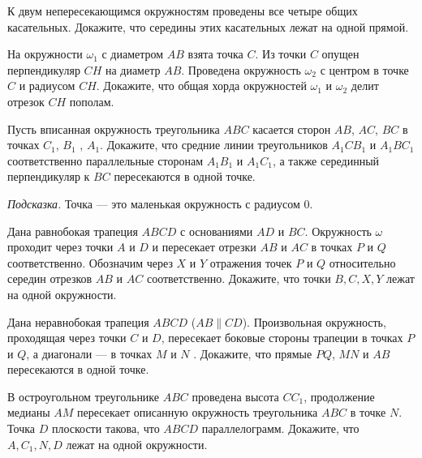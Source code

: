 \begin{problems}

\item К двум непересекающимся окружностям проведены все четыре общих касательных. Докажите, что середины этих касательных лежат на одной прямой.


\item На окружности $\omega_1$ с диаметром $AB$ взята точка $C$. Из точки $C$ опущен перпендикуляр $CH$ на диаметр $AB$. Проведена окружность $\omega_2$ с центром в точке $C$ и радиусом $CH$. Докажите, что общая хорда окружностей $\omega_1$ и $\omega_2$ делит отрезок $CH$ пополам.

\item Пусть вписанная окружность треугольника $ABC$ касается сторон $AB$, $AC$, $BC$ в точках $C_1$, $B_1$ , $A_1$. Докажите, что средние линии треугольников $A_1 CB_1$ и $A_1BC_1$ соответственно параллельные сторонам $A_1 B_1$ и $A_1C_1$, а также серединный перпендикуляр к $BC$ пересекаются в одной точке.

\textit{Подсказка.} Точка --- это маленькая окружность с радиусом 0.

\item Дана равнобокая трапеция $ABCD$ с основаниями $AD$ и $BC$. Окружность $\omega$ проходит через точки $A$ и $D$ и пересекает отрезки $AB$ и $AC$ в точках $P$ и $Q$ соответственно. Обозначим через $X$ и $Y$ отражения точек $P$ и $Q$ относительно середин отрезков $AB$ и $AC$ соответственно. Докажите, что точки $B, C, X, Y$ лежат на одной окружности.

\item Дана неравнобокая трапеция $ABCD$ ($AB \parallel CD$). Произвольная окружность, проходящая
через точки $C$ и $D$, пересекает боковые стороны трапеции в точках $P$ и $Q$, а диагонали --- в
точках $M$ и $N$ . Докажите, что прямые $PQ$, $MN$ и $AB$ пересекаются в одной точке.

\item В остроугольном треугольнике $ABC$ проведена высота $CC_1$, продолжение медианы $AM$ пересекает описанную окружность треугольника $ABC$ в точке $N$. Точка $D$ плоскости такова, что $ABCD$ параллелограмм. Докажите, что $A, C_1, N, D$ лежат на одной окружности.

\end{problems}

